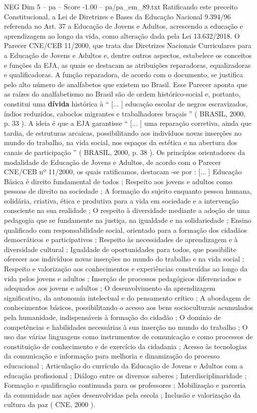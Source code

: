 \begin{textsample}{NEG Dim 5 – pa – Score -1.00 – pa/pa\_em\_89.txt}
Ratificando este preceito Constitucional, a Lei de Diretrizes e Bases da Educação Nacional 9.394/96 referenda no Art. 37 a Educação de Jovens e Adultos, acrescendo a educação e aprendizagem ao longo da vida, como alteração dada pela Lei 13.632/2018.
O Parecer CNE/CEB 11/2000, que trata das Diretrizes Nacionais Curriculares para a Educação de Jovens e Adultos e, dentre outros aspectos, estabelece os conceitos e funções da EJA, as quais se destacam as atribuições reparadoras, equalizadoras e qualificadoras.
A função reparadora, de acordo com o documento, se justifica pelo alto número de analfabetos que existem no Brasil.
Esse Parecer aponta que as raízes do analfabetismo no Brasil são de ordem histórico-social e, portanto, constitui uma \textbf{dívida} histórica à “ [... ] educação escolar de negros escravizados, índios reduzidos, caboclos migrantes e trabalhadores braçais ” ( BRASIL, 2000, p. 33 ).
A ideia é que a EJA garantisse “ [... ] uma reparação corretiva, ainda que tardia, de estruturas arcaicas, possibilitando aos indivíduos novas inserções no mundo do trabalho, na vida social, nos espaços da estética e na abertura dos canais de participação ” ( BRASIL, 2000, p. 38 ).
Os princípios orientadores da modalidade de Educação de Jovens e Adultos, de acordo com o Parecer CNE/CEB nº 11/2000, os quais ratificamos, destacam -se por : [... ] Educação Básica é direito fundamental de todos ; Respeito aos jovens e adultos como pessoas de direito na sociedade ; A formação do sujeito enquanto pessoa humana, solidária, criativa, ética e produtiva para a vida em sociedade e a intervenção consciente na sua realidade ; O respeito à diversidade mediante a adoção de uma pedagogia que se fundamente na justiça, na igualdade e na solidariedade ; Ensino qualificado com responsabilidade social, orientado para a formação dos cidadãos democráticos e participativos ; Respeito às necessidades de aprendizagem e à diversidade cultural ; Igualdade de oportunidades para todos, que possibilite oferecer aos indivíduos novas inserções no mundo do trabalho e na vida social ; Respeito e valorização aos conhecimentos e experiências construídas ao longo da vida pelos jovens e adultos ; Inserção de processos pedagógicos diferenciados e adequados aos jovens e adultos ; O desenvolvimento da aprendizagem significativa, da autonomia intelectual e do pensamento crítico ; A abordagem de conhecimentos básicos, possibilitando o acesso aos bens socioculturais acumulados pela humanidade, indispensáveis à formação do cidadão ; O domínio de competências e habilidades necessárias à sua inserção no mundo do trabalho ; O uso das várias linguagens como instrumentos de comunicação e como processos de constituição de conhecimento e de exercício da cidadania ; Acesso às tecnologias da comunicação e informação para melhoria e dinamização do processo educacional ; Articulação do currículo da Educação de Jovens e Adultos com a educação profissional ; Diálogo entre os diversos saberes ; Interdisciplinaridade ; Formação e qualificação continuada para os professores ; Mobilização e parceria da comunidade nas ações desenvolvidas pela escola ; Inclusão e valorização da cultura da paz ( CNE, 2000 ).

\end{textsample}
